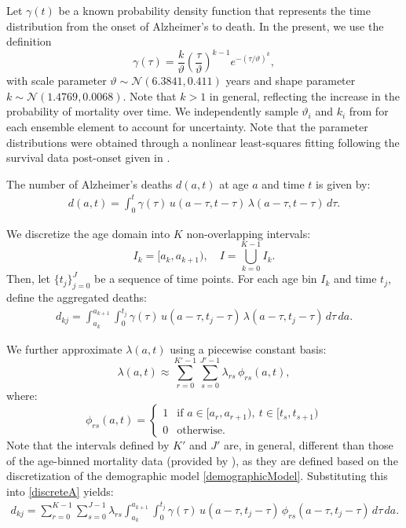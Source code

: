 \documentclass{article}
\begin{document}
\par Let $\gamma(t)$ be a known probability density function that represents the time distribution from the onset of Alzheimer's to death. In the present, we use the definition
\begin{equation}\label{gammaDist}
\gamma(\tau) = \frac{k}{\vartheta} \left( \frac{\tau}{\vartheta} \right)^{k-1} e^{-(\tau/\vartheta)^k},
\end{equation}
with scale parameter $\vartheta\sim \mathcal{N}(6.3841,0.411) $ years and shape parameter $k\sim \mathcal{N}(1.4769, 0.0068)$. Note that $k>1$ in general, reflecting the increase in the probability of mortality over time. We independently sample $\vartheta_i$ and $k_i$ from for each ensemble element to account for uncertainty. Note that the parameter distributions were obtained through a nonlinear least-squares fitting following the survival data post-onset given in \cite{joling2020time}.

\par The number of Alzheimer’s deaths $d(a,t)$ at age $a$ and time $t$ is given by:
\begin{align}\label{deathKernel}
d(a,t) = \int_0^t \gamma(\tau)\, u(a-\tau, t-\tau)\, \lambda(a-\tau, t-\tau)\, d\tau.
\end{align}

We discretize the age domain into $K$ non-overlapping intervals:
\[
I_k = [a_k, a_{k+1}), \quad I = \bigcup_{k=0}^{K-1} I_k.
\]
Then, let $\{t_j\}_{j=0}^{J}$ be a sequence of time points. For each age bin $I_k$ and time $t_j$, define the aggregated deaths:
\begin{align}\label{discreteA}
d_{kj} = \int_{a_k}^{a_{k+1}} \int_0^{t_j} \gamma(\tau)\, u(a - \tau, t_j - \tau)\, \lambda(a - \tau, t_j - \tau)\, d\tau\, da.
\end{align}

We further approximate $\lambda(a,t)$ using a piecewise constant basis:
\[
\lambda(a,t) \approx \sum_{r=0}^{K'-1} \sum_{s=0}^{J'-1} \lambda_{rs}\, \phi_{rs}(a,t),
\]
where:
\[
\phi_{rs}(a,t) = \begin{cases}
1 & \text{if } a \in [a_r, a_{r+1}),\ t \in [t_s, t_{s+1}) \\
0 & \text{otherwise}.
\end{cases}
\]
Note that the intervals defined by $K'$ and $J'$ are, in general, different than those of the age-binned mortality data (provided by \cite{cdc_wonder}), as they are defined based on the discretization of the demographic model \eqref{demographicModel}. Substituting this into \eqref{discreteA} yields:
\begin{align}\label{discreteB}
d_{kj} = \sum_{r=0}^{K-1} \sum_{s=0}^{J-1} \lambda_{rs} \int_{a_k}^{a_{k+1}} \int_0^{t_j} \gamma(\tau)\, u(a - \tau, t_j - \tau)\, \phi_{rs}(a - \tau, t_j - \tau)\, d\tau\, da.
\end{align}
\end{document}
